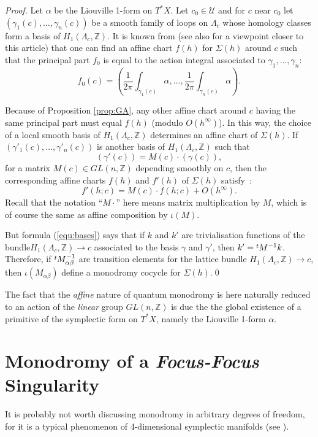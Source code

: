 \documentclass[cmp]{svjour}  %
\newcommand{\fleche}{\rightarrow}
\newcommand{\trsp}{\raisebox{.6ex}{${\scriptstyle t}$}}
\newcommand{\ZM}{\mathbb{Z}}
\newcommand{\U}{\mathcal{U}}
\begin{document}
\begin{proof} Let $\alpha$ be the Liouville 1-form on $T^*X$. Let $c_0\in\U$
and  for $c$ near $c_0$ let $(\gamma_1(c),\dots,\gamma_n(c))$  be a smooth
family of loops on $\Lambda_c$ whose homology classes form a basis of
$H_1(\Lambda_c,\ZM)$. It is known from \cite{charbonnel,colinII} (see
also \cite{san2} for a viewpoint closer to this article) that one can
find an affine chart $f(h)$ for $\Sigma(h)$ around $c$ such that the
principal part $f_0$ is equal to the action integral associated to
$\gamma_1,\dots,\gamma_n$:
\[ f_0(c) = (\frac{1}{2\pi}\int_{\gamma_1(c)}\alpha,
\dots,\frac{1}{2\pi}\int_{\gamma_n(c)}\alpha).\]

Because of Proposition \ref{prop:GA}, any other affine chart around
$c$ having the same principal part must equal $f(h)$ (modulo
$O(h^\infty)$).  In this way, the choice of a local smooth basis of
$H_1(\Lambda_c,\ZM)$ determines an affine chart of
$\Sigma(h)$. If $(\gamma'_1(c),\dots,\gamma'_n(c))$ is another basis
of $H_1(\Lambda_c,\ZM)$ such that
\begin{equation}
        \label{equ:bases}
  (\gamma'(c)) = M(c)\cdot(\gamma(c)),
\end{equation}
for a matrix $M(c)\in GL(n,\ZM)$ depending smoothly on $c$, then the
corresponding affine charts $f(h)$ and $f'(h)$ of $\Sigma(h)$ satisfy~:
\[ f'(h;c) = M(c)\cdot f(h;c) + O(h^\infty).\]
Recall that the notation ``$M\cdot$'' here means matrix multiplication
by $M$, which is of course the same as affine composition by
$\iota(M)$.

But formula (\ref{equ:bases}) says that if $k$ and $k'$ are
trivialisation functions of the bundle\linebreak $H_1(\Lambda_c,\ZM)\fleche c$
associated to the basis $\gamma$ and $\gamma'$, then
$k'=\trsp M^{-1}k$.  Therefore, if $\trsp M_{\alpha\beta}^{-1}$ are
transition elements for the lattice bundle $H_1(\Lambda_c,\ZM)\fleche
c$, then $\iota(M_{\alpha\beta})$ define a monodromy cocycle for
$\Sigma(h)$.\qed
\end{proof}

\begin{remark}
  The fact that the \emph{affine} nature of quantum monodromy is here
  naturally reduced to an action of the \emph{linear} group
  $GL(n,\ZM)$ is due the the global existence of a primitive of the
  symplectic form on $T^*X$, namely the Liouville 1-form $\alpha$.
\end{remark}

\section{Monodromy of a \emph{Focus-Focus} Singularity}
\label{sec:ff}
It is probably not worth discussing monodromy in arbitrary degrees of
freedom, for it is a typical phenomenon of 4-dimensional symplectic
manifolds (see \cite{zung}).
\end{document}

